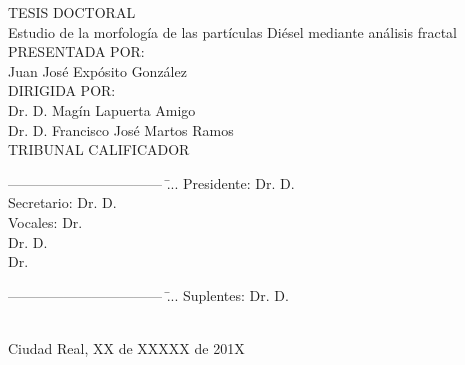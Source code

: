 \pagestyle{empty}
\vspace*{2cm}
\begin{center}
{\large TESIS DOCTORAL}\\
\vspace{1.5cm}
{\huge Estudio de la morfología de las partículas Diésel mediante análisis fractal}\\
\vspace{2.5cm}
\renewcommand{\baselinestretch}{2.0}
PRESENTADA POR:\\
{\large Juan José Expósito González}\\ \vspace{1.0cm}
DIRIGIDA POR:\\
{\large Dr. D. Magín Lapuerta Amigo}\\\vspace{0.2cm}
{\large Dr. D. Francisco José Martos Ramos}\\\vspace{2.5cm}
{\large TRIBUNAL CALIFICADOR}\\ \vspace{1cm}
\large\normalsize
\end{center}
\begin{tabbing}
--------------------------------- \=... \kill
{\large Presidente:} \> {\large Dr. D.}\\
{\large Secretario:} \> {\large Dr. D.}\\
{\large Vocales:} \> {\large Dr.}\\
\> {\large Dr. D. }\\
\> {\large Dr. }\\
\end{tabbing}
\begin{tabbing}
--------------------------------- \=... \kill
{\large Suplentes:} \> {\large Dr. D.}\\
\\
\end{tabbing}

\hfill {\large Ciudad Real, XX de XXXXX de 201X}\\ \vspace{1.5cm}
